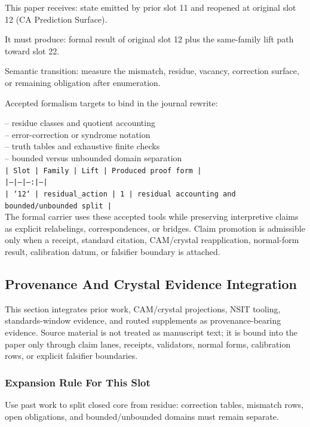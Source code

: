 \documentclass[11pt]{article}
\begin{document}
This paper receives: state emitted by prior slot 11 and reopened at original slot 12 (CA Prediction Surface).

It must produce: formal result of original slot 12 plus the same-family lift path toward slot 22.

Semantic transition: measure the mismatch, residue, vacancy, correction surface, or remaining obligation after enumeration.

Accepted formalism targets to bind in the journal rewrite:

\noindent{}-- residue classes and quotient accounting\\
\noindent{}-- error-correction or syndrome notation\\
\noindent{}-- truth tables and exhaustive finite checks\\
\noindent{}-- bounded versus unbounded domain separation\\

\noindent\texttt{| Slot | Family | Lift | Produced proof form |}\\
\noindent\texttt{|---|---|---:|---|}\\
\noindent\texttt{| `12` | residual\_action | 1 | residual accounting and bounded/unbounded split |}\\

The formal carrier uses these accepted tools while preserving interpretive
claims as explicit relabelings, correspondences, or bridges. Claim promotion is admissible only when a receipt, standard citation,
CAM/crystal reapplication, normal-form result, calibration datum, or falsifier
boundary is attached.

\subsection*{Provenance And Crystal Evidence Integration}

This section integrates prior work, CAM/crystal projections, NSIT tooling,
standards-window evidence, and routed supplements as provenance-bearing
evidence. Source material is not treated as manuscript text; it is bound into
the paper only through claim lanes, receipts, validators, normal forms,
calibration rows, or explicit falsifier boundaries.

\subsubsection*{Expansion Rule For This Slot}

Use past work to split closed core from residue: correction tables, mismatch rows, open obligations, and bounded/unbounded domains must remain separate.
\end{document}
